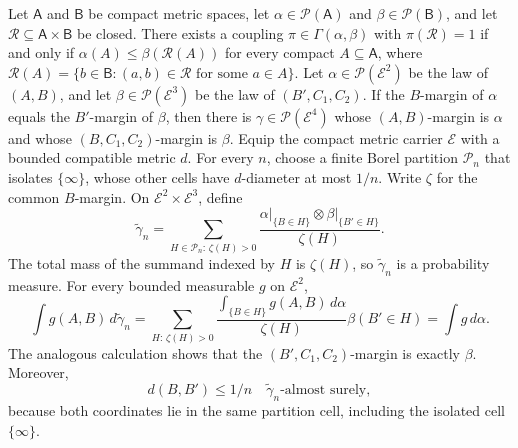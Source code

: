 Let \(\mathsf A\) and \(\mathsf B\) be compact metric spaces, let \(\alpha\in\mathcal P(\mathsf A)\) and \(\beta\in\mathcal P(\mathsf B)\), and let \(\mathcal R\subseteq\mathsf A\times\mathsf B\) be closed.  There exists a coupling \(\pi\in\Gamma(\alpha,\beta)\) with \(\pi(\mathcal R)=1\) if and only if \(\alpha(A)\leq\beta(\mathcal R(A))\) for every compact \(A\subseteq\mathsf A\), where \(\mathcal R(A)=\{b\in\mathsf B:(a,b)\in\mathcal R\text{ for some }a\in A\}\).
Let \(\alpha\in\mathcal P(\mathcal E^2)\) be the law of \((A,B)\), and let \(\beta\in\mathcal P(\mathcal E^3)\) be the law of \((B',C_1,C_2)\).  If the \(B\)-margin of \(\alpha\) equals the \(B'\)-margin of \(\beta\), then there is \(\gamma\in\mathcal P(\mathcal E^4)\) whose \((A,B)\)-margin is \(\alpha\) and whose \((B,C_1,C_2)\)-margin is \(\beta\).
Equip the compact metric carrier \(\mathcal E\) with a bounded compatible metric \(d\).  For every \(n\), choose a finite Borel partition \(\mathcal P_n\) that isolates \(\{\infty\}\), whose other cells have \(d\)-diameter at most \(1/n\).  Write \(\zeta\) for the common \(B\)-margin.  On \(\mathcal E^2\times\mathcal E^3\), define
\[
 \widetilde\gamma_n
 =\sum_{H\in\mathcal P_n:\,\zeta(H)>0}
 \frac{\alpha\vert_{\{B\in H\}}\otimes
       \beta\vert_{\{B'\in H\}}}{\zeta(H)}.
\]
The total mass of the summand indexed by \(H\) is \(\zeta(H)\), so \(\widetilde\gamma_n\) is a probability measure.  For every bounded measurable \(g\) on \(\mathcal E^2\),
\[
 \int g(A,B)\,d\widetilde\gamma_n
 =\sum_{H:\,\zeta(H)>0}
   \frac{\int_{\{B\in H\}}g(A,B)\,d\alpha}{\zeta(H)}
   \beta(B'\in H)
 =\int g\,d\alpha.
\]
The analogous calculation shows that the \((B',C_1,C_2)\)-margin is exactly \(\beta\).  Moreover,
\[
 d(B,B')\leq 1/n
 \quad\widetilde\gamma_n\text{-almost surely},
\]
because both coordinates lie in the same partition cell, including the isolated cell \(\{\infty\}\).

